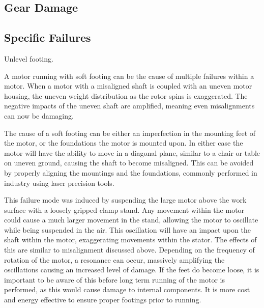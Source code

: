 \subsection{Gear Damage}


\subsection{Specific Failures}



Unlevel footing.

A motor running with soft footing can be the cause of multiple failures within a motor. When a motor with a misaligned shaft is coupled with an uneven motor housing, the uneven weight distribution as the rotor spins is exaggerated. The negative impacts of the uneven shaft are amplified, meaning even misalignments can now be damaging. 

The cause of a soft footing can be either an imperfection in the mounting feet of the motor, or the foundations the motor is mounted upon. In either case the motor will have the ability to move in a diagonal plane, similar to a chair or table on uneven ground, causing the shaft to become misaligned. This can be avoided by properly aligning the mountings and the foundations, commonly performed in industry using laser precision tools. 

This failure mode was induced by suspending the large motor above the work surface with a loosely gripped clamp stand. Any movement within the motor could cause a much larger movement in the stand, allowing the motor to oscillate while being suspended in the air. This oscillation will have an impact upon the shaft within the motor, exaggerating movements within the stator. The effects of this are similar to misalignment discussed above. Depending on the frequency of rotation of the motor, a resonance can occur, massively amplifying the oscillations causing an increased level of damage. If the feet do become loose, it is important to be aware of this before long term running of the motor is performed, as this would cause damage to internal components. It is more cost and energy effective to ensure proper footings prior to running.

